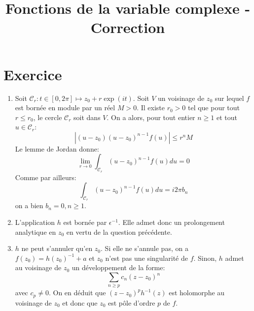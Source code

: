\documentclass[a4paper,12pt]{amsart}
\title{Fonctions de la variable complexe - Correction}
\begin{document}
\maketitle

\section*{Exercice}
\begin{enumerate}
\item Soit $\mathcal{C}_r \colon t \in [0, 2\pi] \mapsto z_0 + r
  \exp(it)$. Soit $V$ un voisinage de $z_0$ sur lequel $f$ est bornée
  en module par un réel $M > 0$. Il existe $r_0 > 0$ tel que pour tout
  $r \leq r_0$, le cercle $\mathcal{C}_r$ soit dans $V$. On a alors,
  pour tout entier $n \geq 1$ et tout $u \in \mathcal{C}_r$:
\[
|(u-z_0)(u-z_0)^{n-1}f(u)| \leq r^n M
\]
Le lemme de Jordan donne:
\[
\lim_{r \to 0} \int_{\mathcal{C}_r} (u-z_0)^{n-1} f(u) du = 0
\]
Comme par ailleurs:
\[
 \int_{\mathcal{C}_r} (u-z_0)^{n-1} f(u) du = i 2 \pi b_n
\]
on a bien $b_n=0, n \geq 1$.
\item L'application $h$ est bornée par $\epsilon^{-1}$. Elle admet
  donc un prolongement analytique en $z_0$ en vertu de la question
  précédente.
\item $h$ ne peut s'annuler qu'en $z_0$. Si elle ne s'annule pas, on a
  $f(z_0) = h(z_0)^{-1}+a$ et $z_0$ n'est pas une singularité de
  $f$. Sinon, $h$ admet au voisinage de $z_0$ un développement de la forme:
\[
\sum_{n \geq p}c_n(z-z_0)^n
\]
avec $c_p \neq 0$. On en déduit que $(z-z_0)^ph^{-1}(z)$ est
holomorphe au voisinage de $z_0$ et donc que $z_0$ est pôle d'ordre
$p$ de $f$.
\end{enumerate}
\end{document}
